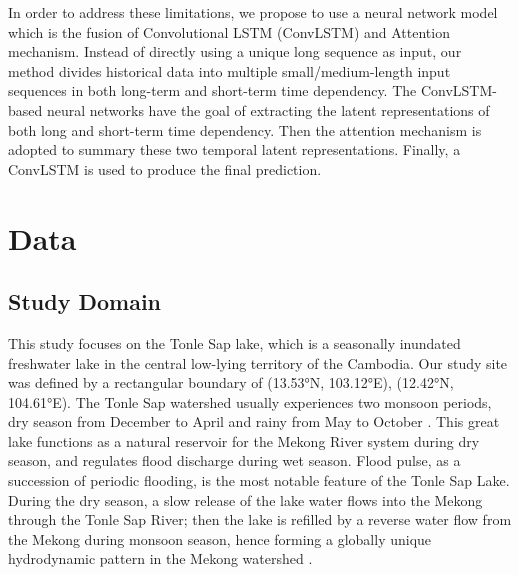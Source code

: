 In order to address these limitations, we propose to use a neural network model which is the fusion of Convolutional LSTM (ConvLSTM) \cite{Shi2015ConvolutionalLN} and Attention mechanism. Instead of directly using a unique long sequence as input, our method divides historical data into multiple small/medium-length input sequences in both long-term and short-term time dependency. The ConvLSTM-based neural networks have the goal of extracting the latent representations of both long and short-term time dependency. Then the attention mechanism is adopted to summary these two temporal latent representations. Finally, a ConvLSTM is used to produce the final prediction.

\section{Data}
\subsection{Study Domain}
This study focuses on the Tonle Sap lake, which is a seasonally inundated freshwater lake in the central low-lying territory of the Cambodia. Our study site was defined by a rectangular boundary of (13.53°N, 103.12°E), (12.42°N, 104.61°E). The Tonle Sap watershed usually experiences two monsoon periods, dry season from December to April and rainy from May to October \cite{article:Hydro-dam-A-nature-based-solution-or-an-ecological-problem}. This great lake functions as a natural reservoir for the Mekong River system during dry season, and regulates flood discharge during wet season. Flood pulse, as a succession of periodic flooding, is the most notable feature of the Tonle Sap Lake. During the dry season, a slow release of the lake water flows into the Mekong through the Tonle Sap River; then the lake is refilled by a reverse water flow from the Mekong during monsoon season, hence forming a globally unique hydrodynamic pattern in the Mekong watershed \cite{article:Socioeconomic-Analysis-Tonle-Sap}.

